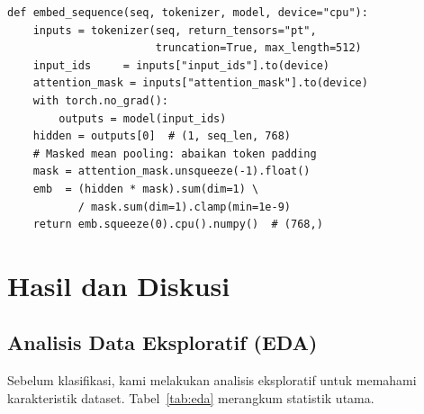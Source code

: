 \documentclass{article}
\begin{document}
\begin{lstlisting}[caption={Encoding satu jendela DNA dengan DNABERT-2.}]
def embed_sequence(seq, tokenizer, model, device="cpu"):
    inputs = tokenizer(seq, return_tensors="pt",
                       truncation=True, max_length=512)
    input_ids     = inputs["input_ids"].to(device)
    attention_mask = inputs["attention_mask"].to(device)
    with torch.no_grad():
        outputs = model(input_ids)
    hidden = outputs[0]  # (1, seq_len, 768)
    # Masked mean pooling: abaikan token padding
    mask = attention_mask.unsqueeze(-1).float()
    emb  = (hidden * mask).sum(dim=1) \
           / mask.sum(dim=1).clamp(min=1e-9)
    return emb.squeeze(0).cpu().numpy()  # (768,)
\end{lstlisting}

\section{Hasil dan Diskusi}
\label{sec:hasil}

\subsection{Analisis Data Eksploratif (EDA)}

Sebelum klasifikasi, kami melakukan analisis eksploratif untuk memahami
karakteristik dataset. Tabel~\ref{tab:eda} merangkum statistik utama.
\end{document}
